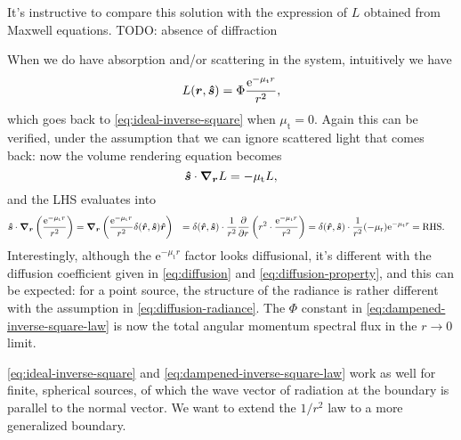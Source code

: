 \documentclass[hyperref, a4paper]{article}
\newcommand*{\ee}{\mathrm{e}}
\def\\{}%
\begin{document}
It's instructive to compare this solution with 
the expression of $L$ obtained from Maxwell equations.
TODO: absence of diffraction

When we do have absorption and/or scattering in the system, 
intuitively we have 
\begin{equation}
    L(\vb*{r}, \vu*{s}) = \Phi \frac{\ee^{- \mu_{\text{t}} r}}{r^2},
    \label{eq:dampened-inverse-square-law}
\end{equation}
which goes back to \eqref{eq:ideal-inverse-square}
when $\mu_{\text{t}} = 0$.
Again this can be verified, under the assumption that 
we can ignore scattered light that comes back:
now the volume rendering equation becomes 
\begin{equation}
    \vu*{s} \cdot \grad_{\vb*{r}} L = - \mu_{\text{t}} L,
\end{equation}
and the LHS evaluates into 
\begin{equation}
    \begin{aligned}
        \vu*{s} \cdot \grad_{\vb*{r}} \left(
            \frac{\ee^{- \mu_{\text{t}} r}}{r^2}
        \right) &= 
        \grad_{\vb*{r}} \left(
            \frac{\ee^{- \mu_{\text{t}} r}}{r^2} 
            \delta(\vu*{r}, \vu*{s}) \vu*{r}
        \right)  \\
        &= \delta(\vu*{r}, \vu*{s}) \cdot \frac{1}{r^2} \pdv{r} \left(
            r^2 \cdot \frac{\ee^{- \mu_{\text{t}} r}}{r^2} 
        \right) \\
        &= \delta(\vu*{r}, \vu*{s}) \cdot \frac{1}{r^2} 
        (- \mu_{\text{r}}) \ee^{- \mu_{\text{t}} r} = \text{RHS}.
    \end{aligned}
\end{equation}
Interestingly, although the $\ee^{- \mu_{\text{t}} r}$ factor 
looks diffusional, 
it's different with the diffusion coefficient given in 
\eqref{eq:diffusion} and \eqref{eq:diffusion-property},
and this can be expected: for a point source, 
the structure of the radiance is rather different with 
the assumption in \eqref{eq:diffusion-radiance}.
The $\Phi$ constant in \eqref{eq:dampened-inverse-square-law}
is now the total angular momentum spectral flux 
in the $r \to 0$ limit.

\eqref{eq:ideal-inverse-square} and \eqref{eq:dampened-inverse-square-law}
work as well for finite, spherical sources,
of which the wave vector of radiation at the boundary 
is parallel to the normal vector.
We want to extend the $1/r^2$ law to a more generalized boundary.
\end{document}
